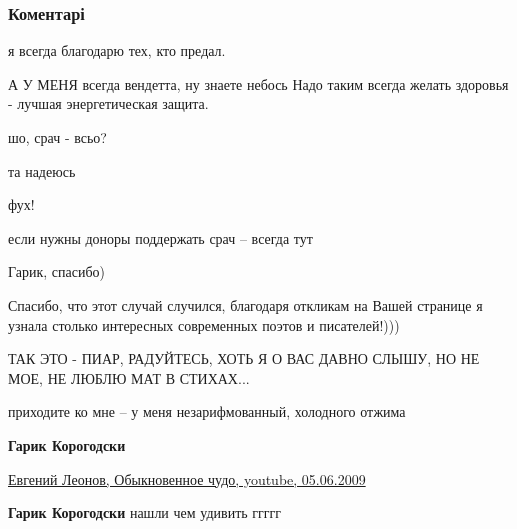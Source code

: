  
 
 
 
 
\subsubsection{Коментарі}
\label{sec:14_12_2016.fb.kabanov_aleksandr.kiev.1.spasibo.cmt}

\begin{itemize} %
я всегда благодарю тех, кто предал.

А У МЕНЯ всегда вендетта, ну знаете небось
Надо таким всегда желать здоровья - лучшая энергетическая защита.


шо, срач - всьо?

та надеюсь


фух!


если нужны доноры поддержать срач – всегда тут

Гарик, спасибо)

Спасибо, что этот случай случился, благодаря откликам на Вашей странице я узнала столько интересных современных поэтов и писателей!)))

ТАК ЭТО - ПИАР, РАДУЙТЕСЬ, ХОТЬ Я О ВАС ДАВНО СЛЫШУ, НО НЕ МОЕ, НЕ ЛЮБЛЮ МАТ В СТИХАХ...

\begin{itemize} %

приходите ко мне – у меня незарифмованный, холодного отжима

\textbf{Гарик Корогодски} 

\href{https://www.youtube.com/watch?v=ltEwy-QdxJE}{%
Евгений Леонов, Обыкновенное чудо, youtube, 05.06.2009%
}

\textbf{Гарик Корогодски} нашли чем удивить ггггг


\end{itemize} %


\end{itemize}
